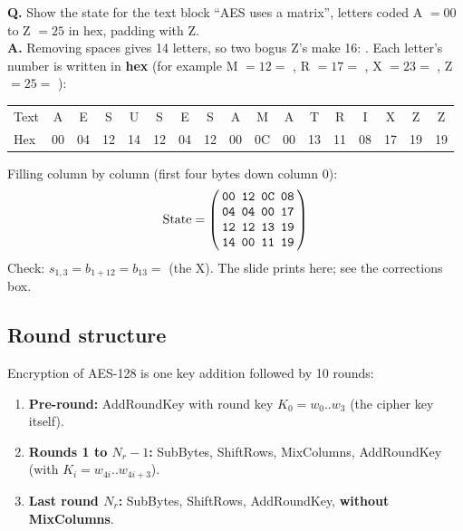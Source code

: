 \begin{worked}
\textbf{Q.} Show the state for the text block ``AES uses a matrix'', letters coded A $= 00$ to Z $= 25$ in hex, padding with Z.\\[2pt]
\textbf{A.} Removing spaces gives 14 letters, so two bogus Z's make 16: . Each letter's number is written in \textbf{hex} (for example M $= 12 = $ , R $= 17 = $ , X $= 23 = $ , Z $= 25 = $ ):
\begin{center}\small\ttfamily\setlength{\tabcolsep}{3.2pt}
\begin{tabular}{@{}l*{16}{c}@{}}
\rmfamily Text & A&E&S&U&S&E&S&A&M&A&T&R&I&X&Z&Z\\
\rmfamily Hex  & 00&04&12&14&12&04&12&00&0C&00&13&11&08&17&19&19
\end{tabular}
\end{center}
Filling column by column (first four bytes down column 0):
\[
\text{State} = \aesM{00&12&0C&08\\04&04&00&17\\12&12&13&19\\14&00&11&19}
\]
Check: $s_{1,3} = b_{1 + 12} = b_{13} = $  (the X). The slide prints  here; see the corrections box.
\end{worked}

\subsection{Round structure}
Encryption of AES-128 is one key addition followed by 10 rounds:
\begin{enumerate}
  \item \textbf{Pre-round:} AddRoundKey with round key $K_0 = w_0..w_3$ (the cipher key itself).
  \item \textbf{Rounds 1 to $N_r - 1$:} SubBytes, ShiftRows, MixColumns, AddRoundKey (with $K_i = w_{4i}..w_{4i+3}$).
  \item \textbf{Last round $N_r$:} SubBytes, ShiftRows, AddRoundKey, \textbf{without MixColumns}.
\end{enumerate}

